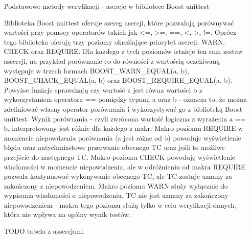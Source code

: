 \documentclass[12pt,a4paper,notitlepage]{report}
\begin{document}
Podstawowe metody weryfikacji - asercje w bibliotece Boost unittest

Biblioteka Boost unittest oferuje szereg asercji, które pozwalają porównywać wartości przy pomocy operatorów takich jak <=, >=, ==, <, >, !=. Oprócz tego biblioteka oferuję trzy poziomy określające priorytet asercji: WARN, CHECK oraz REQUIRE. Dla każdego z tych poziomów istnieje ten sam zestaw assercji, na przykład porównanie co do równości z wartością oczekiwaną występuje w trzech formach BOOST_WARN_EQUAL(a, b), BOOST_CHACK_EQUAL(a, b) oraz BOOST_REQUIRE_EQUAL(a, b).
Powyżse funkcje sprawdzają czy wartość a jest równa wartości b z wykorzystaniem operatora == pomiędzy typami a oraz b - oznacza to, że można zdefiniować własny operator porównania i wykorzystywać go z biblioteką Boost unittest. 
Wynik porównania - czyli zwrócona wartość logiczna z wyrażenia a == b, interpretowany jest róźnie dla każdego z makr. Makro poziomu REQUIRE w momencie niepowdzenia porównania (a jest różne od b) powoduje wyświetlenie błędu oraz natychmiastowe przerwanie obecnego TC oraz jeśli to możliwe przejście do następnego TC.
Makro poziomu CHECK powoduję wyświetlenie wiadomości w momencie niepowodzenia, ale w odróżnieniu od makra REQUIRE pozwala kontynuować wykonywanie obecnego TC, ale TC zostaje uznany za zakończony z niepowodzeniem.
Makro poziomu WARN służy wyłącznie do wypisania wiadomości o niepowodzeniu, TC nie jest uznany za zakończony niepowodzeniem - makra tego poziomu służą tylko w celu weryfikacji danych, która nie wpływa na ogólny wynik testów.

TODO tabela z assercjami
\end{document}
